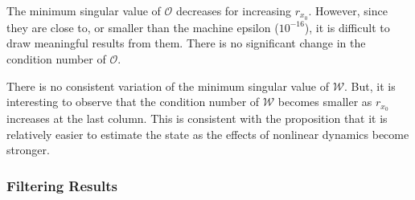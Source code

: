 \documentclass[10pt]{article}
\newcommand{\braces}[1]{\ensuremath{\left\{ #1 \right\}}}
\begin{document}
\begin{center}
\end{center}

  
The minimum singular value of $\mathcal{O}$ decreases for increasing $r_{x_0}$. However, since they are close to, or smaller than the machine epsilon ($10^{-16}$), it is difficult to draw meaningful results from them. There is no significant change in the condition number of $\mathcal{O}$.

There is no consistent variation of the minimum singular value of $\mathcal{W}$. But, it is interesting to observe that the condition number of $\mathcal{W}$ becomes smaller as $r_{x_0}$ increases at the last column. This is consistent with the proposition that it is relatively easier to estimate the state as the effects of nonlinear dynamics become stronger.

\subsubsection{Filtering Results}
\end{document}
